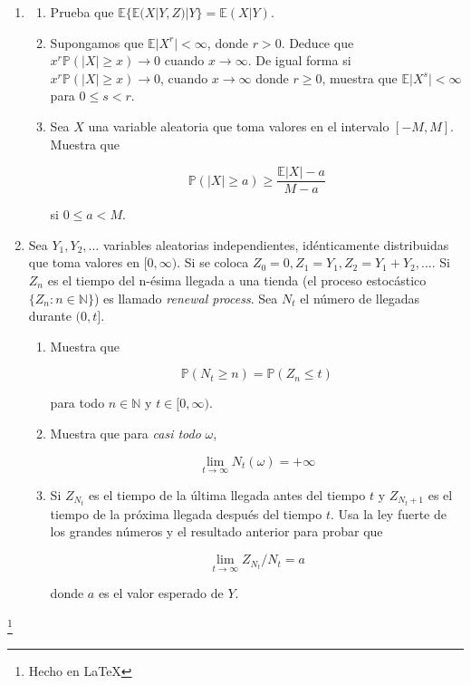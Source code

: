 \documentclass[a4paper,11pt]{report}
\newcommand{\PR}{\mathbb{P}}
\begin{document}
\begin{enumerate}
\[
\PR(X = k| X + Y = n) = \binom{n}{k}p^k(1 - p)^{n - k}
\]

para alg\'un $p$ y todo $0 \leq k \leq n$. Muestra que $X$ e $Y$ tienes distribuciones de Poisson.

\item 

\begin{enumerate}
	\item Prueba que $\mathbb{E}\{\mathbb{E}(X | Y, Z)| Y  \} = \mathbb{E}(X| Y)$.
	\item Supongamos que $\mathbb{E}\vert X^r \vert <  \infty$, donde $r >0$. Deduce que $x^r\PR(\vert X \vert  \geq x) \rightarrow 0$ cuando $x \rightarrow \infty$. De igual forma si $x^r\PR(\vert X \vert  \geq x) \rightarrow 0$,  cuando $x \rightarrow \infty$  donde $r \geq 0$, muestra que $\mathbb{E}\vert X^s \vert < \infty $ para $0 \leq s <  r $.
	\item Sea $X$ una variable aleatoria que toma valores en el intervalo $[-M, M]$. Muestra que
	
	\[
	\mathbb{P}(\vert X \vert \geq  a) \geq \frac{\mathbb{E}\vert X \vert - a }{M - a}
	\]
	
	si $0 \leq a < M$.
\end{enumerate}
\item   Sea $Y_1, Y_2, \dots$ variables aleatorias independientes, id\'enticamente distribuidas que toma \mbox{valores} en $[0, \infty)$. Si se coloca $Z_0 = 0, Z_1 = Y_1, Z_2 = Y_1 + Y_2, \dots$. Si $Z_n$ es el tiempo del n-\'esima llegada a una tienda (el proceso estoc\'astico $\{ Z_n: n \in \mathbb{N}\}$) es llamado \textit{renewal process}. Sea $N_{t}$ el n\'umero de llegadas durante $(0, t]$.

\begin{enumerate}
	\item Muestra que
	
	\[
	\PR(N_t \geq n) = \PR(Z_n \leq t)
	\]
	
	para todo $n \in \mathbb{N}$ y $t \in [0, \infty)$.
	
	\item Muestra que para \textit{casi todo } $\omega$,
	
	\[
	\lim_{t \rightarrow \infty}N_t(\omega) = + \infty
	\]
	
	\item Si $Z_{N_{t}}$ es el tiempo de la \'ultima llegada antes del tiempo $t$ y $Z_{N_{t} + 1}$ es el tiempo de la pr\'oxima  llegada despu\'es  del tiempo $t$. Usa la ley fuerte de los grandes n\'umeros y el resultado anterior para probar que 
	
	\[
	\lim_{t \rightarrow \infty}Z_{N_{t}}/N_{t} = a
	\] 
	
	donde $a$ es el valor esperado de $Y$.
\end{enumerate}
\end{enumerate}

\begin{flushright}
\footnote{Hecho en \LaTeX}
\end{flushright}
\end{document}
